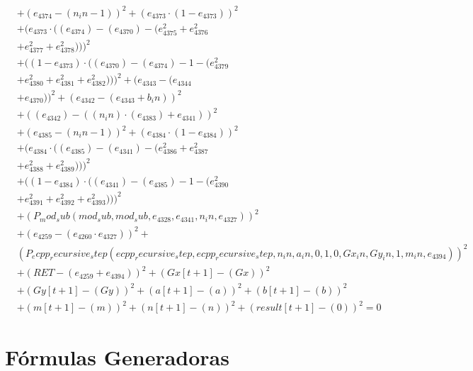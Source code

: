 \documentclass[10pt, a4paper]{article}
\begin{document}
\begin{align*}
& + (e_{4374} - (n_in - 1))^{2} + (e_{4373}  \cdot  (1 - e_{4373}))^{2} \\
& + (e_{4373}  \cdot  ((e_{4374}) - (e_{4370}) - (e_{4375}^{2} + e_{4376}^{2} \\
& + e_{4377}^{2} + e_{4378}^{2})))^{2} \\
& + ((1 - e_{4373})  \cdot  ((e_{4370}) - (e_{4374}) - 1 - (e_{4379}^{2} \\
& + e_{4380}^{2} + e_{4381}^{2} + e_{4382}^{2})))^{2} + (e_{4343} - (e_{4344} \\
& + e_{4370}))^{2} + (e_{4342} - (e_{4343} + b_in))^{2} \\
& + ((e_{4342}) - ((n_in)  \cdot  (e_{4383}) + e_{4341}))^{2} \\
& + (e_{4385} - (n_in - 1))^{2} + (e_{4384}  \cdot  (1 - e_{4384}))^{2} \\
& + (e_{4384}  \cdot  ((e_{4385}) - (e_{4341}) - (e_{4386}^{2} + e_{4387}^{2} \\
& + e_{4388}^{2} + e_{4389}^{2})))^{2} \\
& + ((1 - e_{4384})  \cdot  ((e_{4341}) - (e_{4385}) - 1 - (e_{4390}^{2} \\
& + e_{4391}^{2} + e_{4392}^{2} + e_{4393}^{2})))^{2} \\
& + (P_mod_sub(mod_sub, mod_sub, e_{4328}, e_{4341}, n_in, e_{4327}))^{2} \\
& + (e_{4259} - (e_{4260}  \cdot  e_{4327}))^{2} + \\
& (P_ecpp_recursive_step(ecpp_recursive_step, ecpp_recursive_step, n_in, a_in, 0, 1, 0, Gx_in, Gy_in, 1, m_in, e_{4394}))^{2} \\
& + (RET - (e_{4259} + e_{4394}))^{2} + (Gx[t+1] - (Gx))^{2} \\
& + (Gy[t+1] - (Gy))^{2} + (a[t+1] - (a))^{2} + (b[t+1] - (b))^{2} \\
& + (m[t+1] - (m))^{2} + (n[t+1] - (n))^{2} + (result[t+1] - (0))^{2} = 0
\end{align*}\part{Fórmulas Generadoras}
\end{document}

